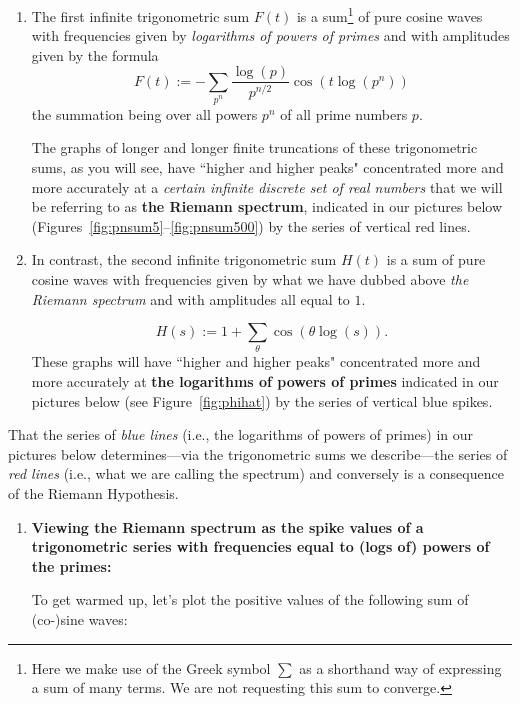 \documentclass[openany]{book}
\theoremstyle{plain}
\theoremstyle{definition}
\begin{document}
{\begin{enumerate}\item The first infinite trigonometric sum $F(t)$  is a sum{\footnote{Here we
    make use of the Greek symbol $\sum$ as a shorthand way of
    expressing a sum of many terms.  We are not requesting this sum to
    converge.}}  of pure cosine waves with frequencies given by {\it logarithms of powers of primes} and with amplitudes given by the formula $$F(t):=
-\sum_{p^n}{\frac{\log(p)}{p^{n/2}}}\cos(t\log(p^n))
$$ the summation being over all powers $p^n$ of all prime numbers $p$.

The graphs of longer and longer finite truncations of these trigonometric sums, as you will see, have ``higher and higher peaks" concentrated more and more accurately at a  {\it certain infinite discrete set of real numbers} that we will be referring to as {\bf the Riemann spectrum}, indicated in our pictures below (Figures~\ref{fig:pnsum5}--\ref{fig:pnsum500}) by the series of vertical red lines.

\item  In contrast, the second infinite trigonometric sum $H(t)$ is a sum of pure cosine waves with frequencies given by what we have dubbed above {\it the Riemann spectrum} and with amplitudes all equal to $1$.

$$
  H(s):=1+\sum_{\theta}\cos(\theta \log(s)).
 $$ These graphs will have ``higher and higher peaks" concentrated more and more accurately at {\bf the logarithms of powers of primes} indicated in our pictures below (see Figure~\ref{fig:phihat}) by the series of vertical blue spikes.

               \end{enumerate}




That the series of {\it blue lines} (i.e., the logarithms of powers of
primes) in our pictures below determines---via the trigonometric
sums we describe---the series of {\it red lines} (i.e., what we are
calling the spectrum) and conversely is a consequence of the Riemann
Hypothesis.
\begin{enumerate}

\item {\bf Viewing the Riemann spectrum as the spike values of a trigonometric series with
frequencies equal to (logs of) powers of the primes:}

  To get warmed up, let's plot the positive values of the following
  sum of (co-)sine waves:


\end{enumerate}}
\end{document}
